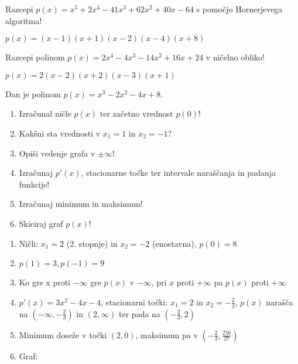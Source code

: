 \begin{vaja}
  Razcepi $p(x)=x^5+2x^4-41x^3+62x^2+40x-64$  s pomočjo Hornerjevega algoritma!


  \begin{odgovor}
    $p(x)=(x-1)(x+1)(x-2)(x-4)(x+8)$
  \end{odgovor}
\end{vaja}

\begin{vaja}
  Razcepi polinom $p(x)=2x^4-4x^3-14x^2+16x+24$  v ničelno obliko!




  \begin{odgovor}
    $p(x)=2(x-2)(x+2)(x-3)(x+1)$
  \end{odgovor}
\end{vaja}

\begin{vaja}
  Dan je polinom $p(x)= x^3-2x^2-4x+8$.
\begin{enumerate}
\item Izračunal ničle $p(x)$ ter začetno vrednost $p(0)$!
\item Kakšni sta vrednosti v $x_1=1$ in $x_2=-1$?
\item Opiši vedenje grafa v $\pm \infty$!
\item Izračunaj $p'(x)$, stacionarne točke ter intervale naraščanja in padanja funkcije!
\item Izračunaj minimum in maksimum!
\item Skiciraj graf $p(x)$!
\end{enumerate}

  \begin{odgovor}
    \begin{enumerate}
\item Ničli: $x_1=2$ (2. stopnje) in $x_2=-2$ (enostavna), $p(0)=8$
\item $p(1)=3, p(-1)=9$
\item Ko gre x proti $-\infty$ gre $p(x)$ v $-\infty$, pri $x$ proti $+\infty$ pa $p(x)$ proti $+\infty$
\item $p'(x)=3x^2-4x-4$, stacionarni točki: $x_1=2$ in $x_2=-\frac{2}{3}$, $p(x)$ narašča na $(-\infty, -\frac{2}{3})$  in $(2, \infty)$ ter pada na $(-\frac{2}{3}, 2)$
\item Minimum doseže v točki $(2, 0)$, maksimum pa v $(-\frac{2}{3}, \frac{256}{27})$
\item Graf:
\begin{figure}[h!]
\centering
{}
\end{figure}






\end{enumerate}
\end{odgovor}
\end{vaja}
